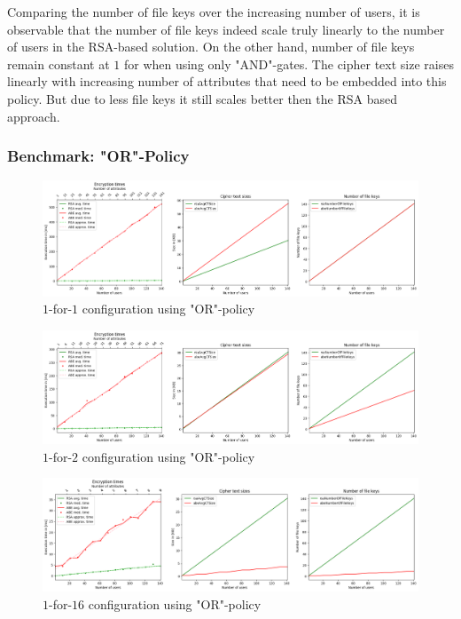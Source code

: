 Comparing the number of file keys over the increasing number of users, it is observable that the number of file keys indeed scale truly linearly to the number of users in the RSA-based solution. On the other hand, number of file keys remain constant at $1$ for \name when using only "AND"-gates. The cipher text size raises linearly with increasing number of attributes that need to be embedded into this policy. But due to less file keys it still scales better then the RSA based approach. 

\subsubsection{Benchmark: "OR"-Policy}
\begin{figure}[!t]
\centering
    \includegraphics[width=\linewidth]{img/eval-or-policy/encrypt_incrementing_10_attribute_increment_1per1User.png}
    \caption{$1$-for-$1$ configuration using "OR"-policy}
    \label{fig:1-for-1-or}
\end{figure}
\begin{figure}[!t]
\centering
    \includegraphics[width=\linewidth]{img/eval-or-policy/encrypt_incrementing_10_attribute_increment_1per2User.png}
    \caption{$1$-for-$2$ configuration using "OR"-policy}
    \label{fig:1-for-2-or}
\end{figure}
\begin{figure}[!t]
\centering
    \includegraphics[width=\linewidth]{img/eval-or-policy/encrypt_incrementing_10_attribute_increment_1per16User.png}
    \caption{$1$-for-$16$ configuration using "OR"-policy}
    \label{fig:1-for-16-or}
\end{figure}
